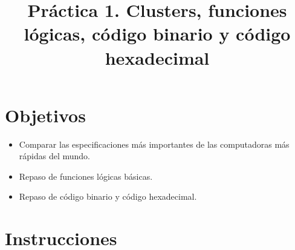\documentclass[12pt,a4paper]{article}
\title{\textbf{Práctica 1. Clusters, funciones lógicas, código binario y código hexadecimal}}
\begin{document}


\section*{Objetivos}
\begin{itemize}[label=--]
    \item Comparar las especificaciones más importantes de las computadoras más rápidas del mundo.
    \item Repaso de funciones lógicas básicas.
    \item Repaso de código binario y código hexadecimal.
\end{itemize}

\section*{Instrucciones}










\end{document}
